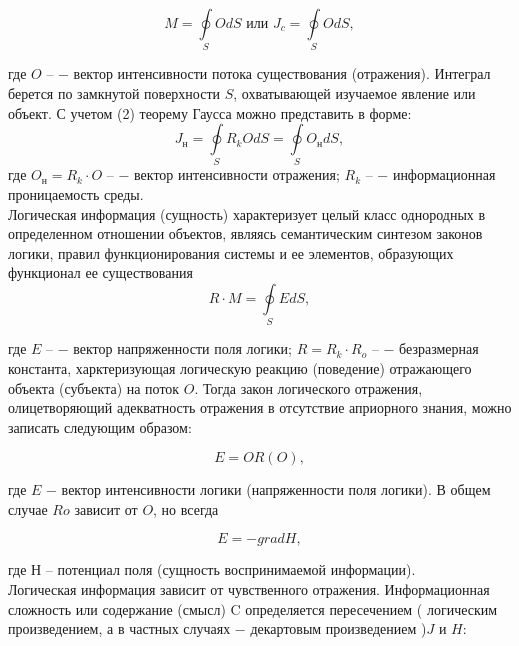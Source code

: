 \documentclass[a4paper,12pt]{report}
\begin{document}
\begin{equation}
\label{trivial}
	M = \oint\limits_{S}O dS \mbox{ или }	   J_c = \oint\limits_{S}O dS ,	      
\end{equation}   							
       	         
где $O \mbox{ –}$ − вектор интенсивности потока существования (отражения). Интеграл берется по замкнутой поверхности $S$, охватывающей изучаемое явление или объект. С учетом (2) теорему Гаусса можно представить в форме:
\begin{equation}
\label{trivial}
	 J_н = \oint\limits_{S} R_k O dS = \oint\limits_{S} O_н dS, 								
\end{equation} 
где $O_н = R_k \cdot O \mbox{ –}$ − вектор интенсивности отражения; $R_k \mbox{ –}$ − информационная проницаемость среды.\\

	Логическая информация (сущность) характеризует целый класс однородных в определенном отношении объектов, являясь семантическим синтезом законов логики, правил функционирования системы и ее элементов, образующих функционал ее существования 
\begin{equation}
\label{trivial}
R \cdot M = \oint\limits_{S} E dS,
\end{equation} 
	 									
где $E \mbox{ –}$ − вектор напряженности поля логики; $R = R_k \cdot R_o \mbox{ –}$ − безразмерная константа, харктеризующая логическую реакцию (поведение) отражающего объекта (субъекта) на поток $O$. Тогда закон логического отражения, олицетворяющий адекватность отражения в отсутствие априорного знания, можно записать следующим образом:

	\begin{equation}
\label{trivial}
E = O R(O),
\end{equation} 

где $E$ − вектор интенсивности логики (напряженности поля логики). В общем случае $Ro$ зависит от $O$, но всегда 

	\begin{equation}
\label{trivial}
E  = - grad H,
\end{equation} 

где $Н$ – потенциал поля (сущность воспринимаемой информации).\\

	Логическая информация зависит от чувственного отражения. Информационная сложность или содержание (смысл) C определяется пересечением ( логическим произведением, а в частных случаях − декартовым произведением )$J$ и $H$:
\end{document}
